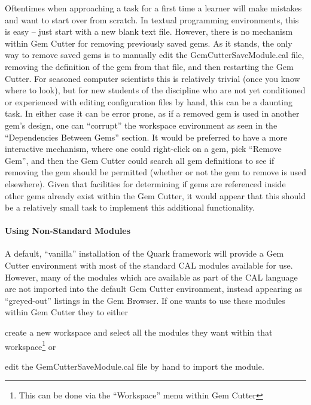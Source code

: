 Oftentimes when approaching a task for a first time a learner will make mistakes and want to start over from scratch.  In textual programming environments, this is easy -- just start with a new blank text file.  However, there is no mechanism within Gem Cutter for removing previously saved gems.  As it stands, the only way to remove saved gems is to manually edit the GemCutterSaveModule.cal file, removing the definition of the gem from that file, and then restarting the Gem Cutter.  For seasoned computer scientists this is relatively trivial (once you know where to look), but for new students of the discipline who are not yet conditioned or experienced with editing configuration files by hand, this can be a daunting task.  In either case it can be error prone, as if a removed gem is used in another gem's design, one can ``corrupt'' the workspace environment as seen in the ``Dependencies Between Gems'' section.  It would be preferred to have a more interactive mechanism, where one could right-click on a gem, pick ``Remove Gem'', and then the Gem Cutter could search all gem definitions to see if removing the gem should be permitted (\ie whether or not the gem to remove is used elsewhere).  Given that facilities for determining if gems are referenced inside other gems already exist within the Gem Cutter, it would appear that this should be a relatively small task to implement this additional functionality.

\paragraph{Using Non-Standard Modules}

A default, ``vanilla'' installation of the Quark framework will provide a Gem Cutter environment with most of the standard CAL modules available for use.  However, many of the modules which are available as part of the CAL language are not imported into the default Gem Cutter environment, instead appearing as ``greyed-out'' listings in the Gem Browser.  If one wants to use these modules within Gem Cutter they to either \begin{inparaenum}\item create a new workspace and select all the modules they want within that workspace\footnote{This can be done via the ``Workspace'' menu within Gem Cutter} or \item edit the GemCutterSaveModule.cal file by hand to import the module.\end{inparaenum}

